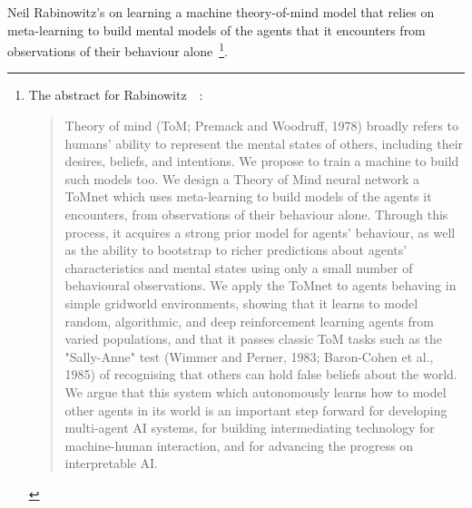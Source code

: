 Neil Rabinowitz's {} on learning a machine theory-of-mind model that relies on meta-learning to build mental models of the agents that it encounters from observations of their behaviour alone~\cite{RabinowitzetalCoRR-18}\footnote{%
%
  The abstract for Rabinowitz~\etal{}~\cite{RabinowitzetalCoRR-18}:
%
  \begin{quotation}
%
    Theory of mind (ToM; Premack and Woodruff, 1978) broadly refers to humans' ability to represent the mental states of others, including their desires, beliefs, and intentions. We propose to train a machine to build such models too. We design a Theory of Mind neural network \emdash{} a ToMnet \emdash{} which uses meta-learning to build models of the agents it encounters, from observations of their behaviour alone. Through this process, it acquires a strong prior model for agents' behaviour, as well as the ability to bootstrap to richer predictions about agents' characteristics and mental states using only a small number of behavioural observations. We apply the ToMnet to agents behaving in simple gridworld environments, showing that it learns to model random, algorithmic, and deep reinforcement learning agents from varied populations, and that it passes classic ToM tasks such as the "Sally-Anne" test (Wimmer and Perner, 1983; Baron-Cohen et al., 1985) of recognising that others can hold false beliefs about the world. We argue that this system \emdash{} which autonomously learns how to model other agents in its world \emdash{} is an important step forward for developing multi-agent AI systems, for building intermediating technology for machine-human interaction, and for advancing the progress on interpretable AI.
%
\end{quotation}}.

